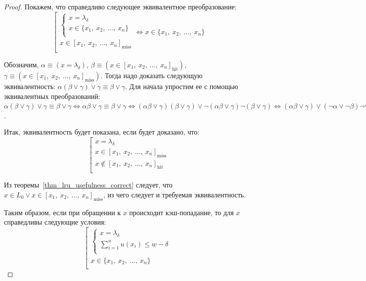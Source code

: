 \begin{proof}
    Покажем, что справедливо следующее эквивалентное преобразование:
  $$\left[\begin{array}{l}
        \left\{\begin{array}{l}
            x = \lambda_\delta\\
            x \in \{x_1,~x_2,~\dots,~x_n\}\\
        \end{array}\right.\\
        x \in [x_1,~x_2,~\dots,~x_n]_{\mbox{miss}}\\
    \end{array}\right. \Leftrightarrow x \in \{x_1,~x_2,~\dots,~x_n\}$$

    Обозначим, $\alpha \equiv (x = \lambda_\delta)$, $\beta \equiv (x \in
    [x_1,~x_2,~\dots,~x_n]_{\mbox{hit}})$, $\gamma \equiv (x \in
    [x_1,~x_2,~\dots,~x_n]_{\mbox{miss}})$. Тогда надо доказать
    следующую эквивалентность: $\alpha (\beta \vee \gamma) \vee \gamma \equiv
    \beta \vee \gamma$. Для начала упростим ее с помощью
    эквивалентных преобразований: $\alpha (\beta \vee \gamma) \vee \gamma \equiv
    \beta \vee \gamma \Leftrightarrow \alpha \beta \vee \gamma \equiv
    \beta \vee \gamma \Leftrightarrow (\alpha \beta \vee \gamma)(\beta \vee \gamma)
    \vee \neg(\alpha \beta \vee \gamma)\neg(\beta \vee \gamma)
    \Leftrightarrow (\alpha \beta \vee \gamma) \vee (\neg \alpha
    \vee \neg \beta)\neg \gamma \neg \beta \Leftrightarrow (\alpha \beta \vee \gamma) \vee
    \neg \gamma \neg \beta \Leftrightarrow \alpha \vee \gamma \vee \neg \beta$.

    Итак, эквивалентность будет показана, если будет доказано, что:
  $$\left[\begin{array}{l}
        x = \lambda_\delta\\
        x \in [x_1,~x_2,~\dots,~x_n]_{\mbox{miss}}\\
        x \notin [x_1,~x_2,~\dots,~x_n]_{\mbox{hit}}\\
    \end{array}\right.$$

    Из теоремы~\ref{thm_lru_usefulness_correct} следует, что $x \in L_0 \vee x \in
    [x_1,~x_2,~\dots,~x_n]_{\mbox{miss}}$, из чего следует и
    требуемая эквивалентность.

    Таким образом, если при обращении к $x$ происходит
    кэш-попадание, то для $x$ справедливы следующие условия:
  $$\left[\begin{array}{l}
        \left\{\begin{array}{l}
            x = \lambda_\delta\\
            \sum_{i=1}^n u(x_i) \leqslant w - \delta\\
        \end{array}\right.\\[1cm]
        x \in \{x_1,~x_2,~\dots,~x_n\}\\
    \end{array}\right.$$
\end{proof}

